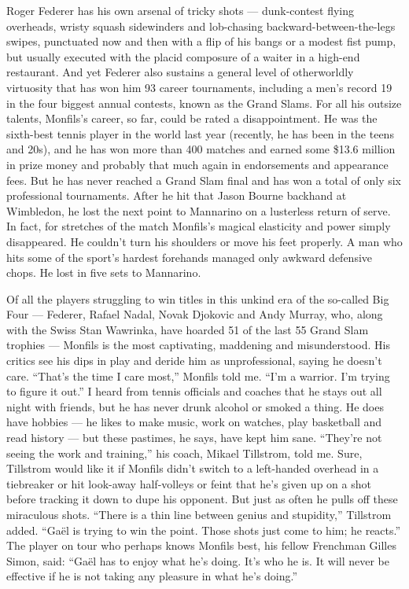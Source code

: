 Roger Federer has his own arsenal of tricky shots --- dunk-contest
flying overheads, wristy squash sidewinders and lob-chasing
backward-between-the-legs swipes, punctuated now and then with a flip of
his bangs or a modest fist pump, but usually executed with the placid
composure of a waiter in a high-end restaurant. And yet Federer also
sustains a general level of otherworldly virtuosity that has won him 93
career tournaments, including a men's record 19 in the four biggest
annual contests, known as the Grand Slams. For all his outsize talents,
Monfils's career, so far, could be rated a disappointment. He was the
sixth-best tennis player in the world last year (recently, he has been
in the teens and 20s), and he has won more than 400 matches and earned
some \$13.6 million in prize money and probably that much again in
endorsements and appearance fees. But he has never reached a Grand Slam
final and has won a total of only six professional tournaments. After he
hit that Jason Bourne backhand at Wimbledon, he lost the next point to
Mannarino on a lusterless return of serve. In fact, for stretches of the
match Monfils's magical elasticity and power simply disappeared. He
couldn't turn his shoulders or move his feet properly. A man who hits
some of the sport's hardest forehands managed only awkward defensive
chops. He lost in five sets to Mannarino.

Of all the players struggling to win titles in this unkind era of the
so-called Big Four --- Federer, Rafael Nadal, Novak Djokovic and Andy
Murray, who, along with the Swiss Stan Wawrinka, have hoarded 51 of the
last 55 Grand Slam trophies --- Monfils is the most captivating,
maddening and misunderstood. His critics see his dips in play and deride
him as unprofessional, saying he doesn't care. ``That's the time I care
most,'' Monfils told me. ``I'm a warrior. I'm trying to figure it out.''
I heard from tennis officials and coaches that he stays out all night
with friends, but he has never drunk alcohol or smoked a thing. He does
have hobbies --- he likes to make music, work on watches, play
basketball and read history --- but these pastimes, he says, have kept
him sane. ``They're not seeing the work and training,'' his coach,
Mikael Tillstrom, told me. Sure, Tillstrom would like it if Monfils
didn't switch to a left-handed overhead in a tiebreaker or hit look-away
half-volleys or feint that he's given up on a shot before tracking it
down to dupe his opponent. But just as often he pulls off these
miraculous shots. ``There is a thin line between genius and stupidity,''
Tillstrom added. ``Gaël is trying to win the point. Those shots just
come to him; he reacts.'' The player on tour who perhaps knows Monfils
best, his fellow Frenchman Gilles Simon, said: ``Gaël has to enjoy what
he's doing. It's who he is. It will never be effective if he is not
taking any pleasure in what he's doing.''

